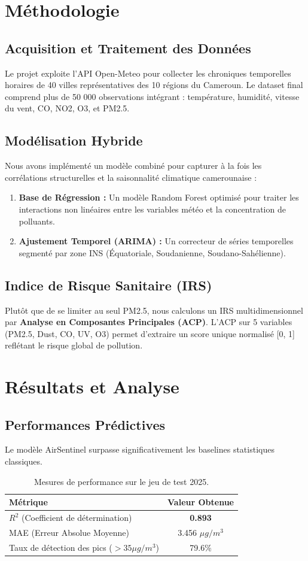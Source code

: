 \documentclass[12pt,a4paper]{report}
\begin{document}
\chapter{Méthodologie}
\section{Acquisition et Traitement des Données}
Le projet exploite l'API Open-Meteo pour collecter les chroniques temporelles horaires de 40 villes représentatives des 10 régions du Cameroun. Le dataset final comprend plus de 50 000 observations intégrant : température, humidité, vitesse du vent, CO, NO2, O3, et PM2.5.

\section{Modélisation Hybride}
Nous avons implémenté un modèle combiné pour capturer à la fois les corrélations structurelles et la saisonnalité climatique camerounaise :
\begin{enumerate}
    \item \textbf{Base de Régression :} Un modèle Random Forest optimisé pour traiter les interactions non linéaires entre les variables météo et la concentration de polluants.
    \item \textbf{Ajustement Temporel (ARIMA) :} Un correcteur de séries temporelles segmenté par zone INS (Équatoriale, Soudanienne, Soudano-Sahélienne).
\end{enumerate}

\section{Indice de Risque Sanitaire (IRS)}
Plutôt que de se limiter au seul PM2.5, nous calculons un IRS multidimensionnel par \textbf{Analyse en Composantes Principales (ACP)}. L'ACP sur 5 variables (PM2.5, Dust, CO, UV, O3) permet d'extraire un score unique normalisé [0, 1] reflétant le risque global de pollution.

\chapter{Résultats et Analyse}
\section{Performances Prédictives}
Le modèle AirSentinel surpasse significativement les baselines statistiques classiques.
\begin{table}[H]
\centering
\begin{tabular}{lc}
\toprule
Métrique & Valeur Obtenue \\
\midrule
$R^2$ (Coefficient de détermination) & \textbf{0.893} \\
MAE (Erreur Absolue Moyenne) & 3.456 $\mu g/m^3$ \\
Taux de détection des pics ($> 35 \mu g/m^3$) & 79.6\% \\
\bottomrule
\end{tabular}
\caption{Mesures de performance sur le jeu de test 2025.}
\end{table}
\end{document}
